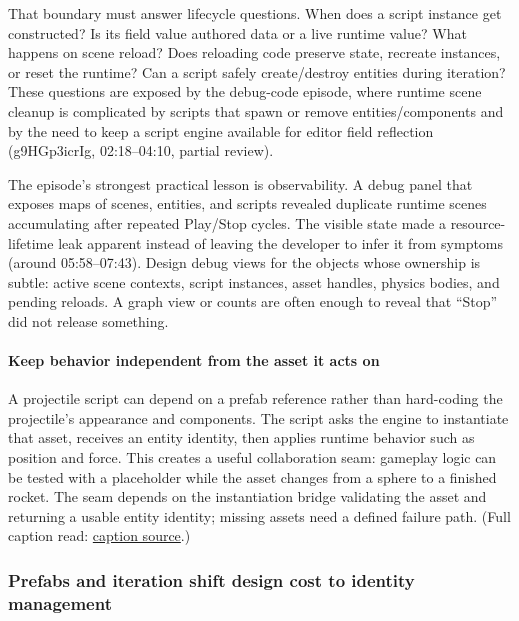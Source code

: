 That boundary must answer lifecycle questions. When does a script instance get constructed? Is its field value authored data or a live runtime value? What happens on scene reload? Does reloading code preserve state, recreate instances, or reset the runtime? Can a script safely create/destroy entities during iteration? These questions are exposed by the debug-code episode, where runtime scene cleanup is complicated by scripts that spawn or remove entities/components and by the need to keep a script engine available for editor field reflection (g9HGp3icrIg, 02:18--04:10, partial review).

The episode's strongest practical lesson is observability. A debug panel that exposes maps of scenes, entities, and scripts revealed duplicate runtime scenes accumulating after repeated Play/Stop cycles. The visible state made a resource-lifetime leak apparent instead of leaving the developer to infer it from symptoms (around 05:58--07:43). Design debug views for the objects whose ownership is subtle: active scene contexts, script instances, asset handles, physics bodies, and pending reloads. A graph view or counts are often enough to reveal that ``Stop'' did not release something.

\paragraph{Keep behavior independent from the asset it acts on}\label{keep-behavior-independent-from-the-asset-it-acts-on}

A projectile script can depend on a prefab reference rather than hard-coding the projectile's appearance and components. The script asks the engine to instantiate that asset, receives an entity identity, then applies runtime behavior such as position and force. This creates a useful collaboration seam: gameplay logic can be tested with a placeholder while the asset changes from a sphere to a finished rocket. The seam depends on the instantiation bridge validating the asset and returning a usable entity identity; missing assets need a defined failure path. (Full caption read: \href{https://www.youtube.com/watch?v=ogQTYSokqAI}{caption source}.)

\subsubsection{Prefabs and iteration shift design cost to identity management}\label{prefabs-and-iteration-shift-design-cost-to-identity-management}

